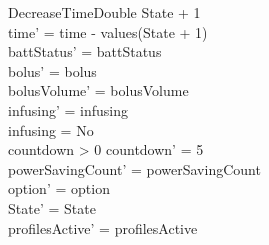 \begin{schema}{DecreaseTimeDouble}
	State + 1 \\
	time' = time - values(State + 1)\\
	battStatus' = battStatus\\
	bolus' = bolus\\
	bolusVolume' = bolusVolume\\
	infusing' = infusing\\
	infusing = No\\
	countdown > 0 \land countdown' = 5\\
	powerSavingCount' = powerSavingCount\\ 
	option' = option\\
State' = State\\
profilesActive' = profilesActive
\end{schema}

